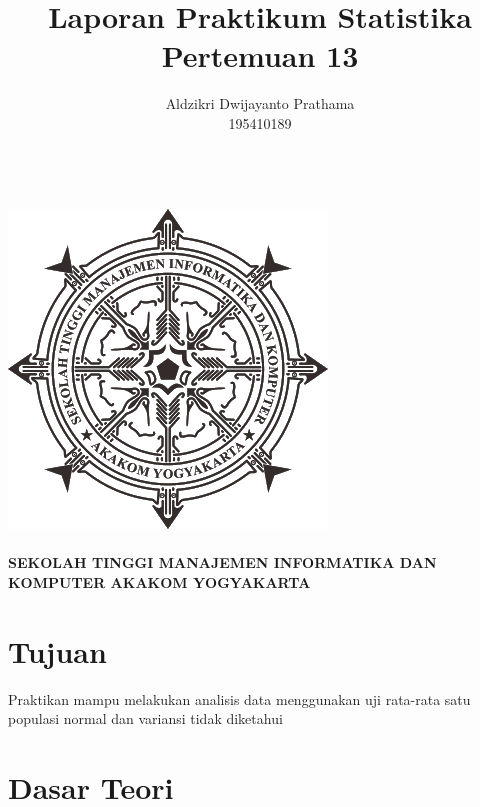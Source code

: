 \documentclass[a4paper,12pt]{article}
\begin{document}
\title{Laporan Praktikum Statistika Pertemuan 13}
\author{Aldzikri Dwijayanto Prathama 
	\\195410189}
\makeatletter
\begin{titlepage}
	\begin{center}
		{\huge \bfseries \@title }\\[14ex]
		\includegraphics[scale=.8]{logo}\\[4ex]
		{\large \@author}\\[20ex]
		{\large \bfseries {SEKOLAH TINGGI MANAJEMEN INFORMATIKA DAN KOMPUTER
				AKAKOM YOGYAKARTA}}
	\end{center}


\end{titlepage}
\makeatother
\newpage
\tableofcontents
\newpage
\section{Tujuan}
Praktikan mampu melakukan analisis data menggunakan uji rata-rata satu populasi normal dan variansi tidak diketahui

\section{Dasar Teori}
\end{document}

